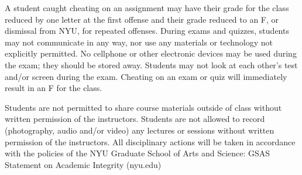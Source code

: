 \documentclass[reqno,psamsfonts, 12pt]{amsart}
\theoremstyle{remark}
\numberwithin{equation}{section}
\begin{document}
A student caught cheating on an assignment may have their grade for the class reduced by one letter at the first offense and their grade reduced to an F, or dismissal from NYU, for repeated offenses. 
During exams and quizzes, students may not communicate in any way, nor use any materials or technology not explicitly permitted. 
No cellphone or other electronic devices may be used during the exam; they should be stored away. 
Students may not look at each other’s test and/or screen during the exam. Cheating on an exam or quiz will immediately result in an F for the class.

Students are not permitted to share course materials outside of class without written permission of the instructors. 
Students are not allowed to record (photography, audio and/or video) any lectures or sessions without written permission of the instructors.
All disciplinary actions will be taken in accordance with the policies of the NYU Graduate School of Arts and Science: GSAS Statement on Academic Integrity (nyu.edu)
\end{document}
